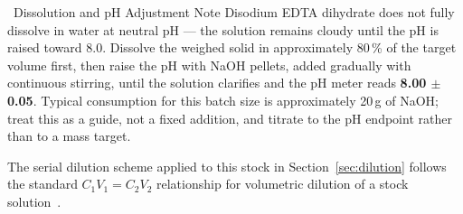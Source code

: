 \begin{notebox}{\faTint\ Dissolution and pH Adjustment Note}
Disodium EDTA dihydrate does not fully dissolve in water at neutral pH --- the solution
remains cloudy until the pH is raised toward 8.0. Dissolve the weighed solid in
approximately 80\,\% of the target volume first, then raise the pH with NaOH pellets,
added gradually with continuous stirring, until the solution clarifies and the pH meter
reads \textbf{8.00 $\pm$ 0.05}. Typical consumption for this batch size is approximately
20\,g of NaOH; treat this as a guide, not a fixed addition, and titrate to the pH endpoint
rather than to a mass target.
\end{notebox}

The serial dilution scheme applied to this stock in Section~\ref{sec:dilution} follows the
standard $C_1V_1 = C_2V_2$ relationship for volumetric dilution of a stock
solution~\cite{harris2015}.
